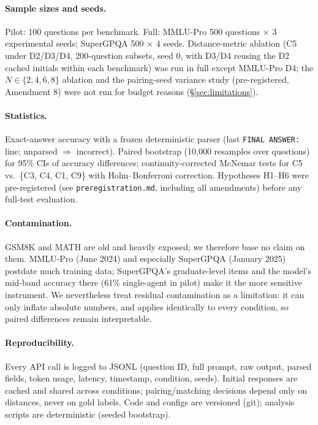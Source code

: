 \documentclass[11pt]{article}
\begin{document}
\paragraph{Sample sizes and seeds.} Pilot: 100 questions per benchmark. Full: MMLU-Pro 500 questions $\times$ 3 experimental seeds; SuperGPQA 500 $\times$ 4 seeds. Distance-metric ablation (C5 under D2/D3/D4, 200-question subsets, seed 0, with D3/D4 reusing the D2 cached initials within each benchmark) was run in full except MMLU-Pro D4; the $N \in \{2,4,6,8\}$ ablation and the pairing-seed variance study (pre-registered, Amendment 8) were not run for budget reasons (\S\ref{sec:limitations}).

\paragraph{Statistics.} Exact-answer accuracy with a frozen deterministic parser (last \texttt{FINAL ANSWER:} line; unparsed $\Rightarrow$ incorrect). Paired bootstrap (10{,}000 resamples over questions) for 95\% CIs of accuracy differences; continuity-corrected McNemar tests for C5 vs.\ \{C3, C4, C1, C9\} with Holm--Bonferroni correction. Hypotheses H1--H6 were pre-registered (see \texttt{preregistration.md}, including all amendments) before any full-test evaluation.

\paragraph{Contamination.} GSM8K and MATH are old and heavily exposed; we therefore base no claim on them. MMLU-Pro (June 2024) and especially SuperGPQA (January 2025) postdate much training data; SuperGPQA's graduate-level items and the model's mid-band accuracy there (61\% single-agent in pilot) make it the more sensitive instrument. We nevertheless treat residual contamination as a limitation: it can only inflate absolute numbers, and applies identically to every condition, so paired differences remain interpretable.

\paragraph{Reproducibility.} Every API call is logged to JSONL (question ID, full prompt, raw output, parsed fields, token usage, latency, timestamp, condition, seeds). Initial responses are cached and shared across conditions; pairing/matching decisions depend only on distances, never on gold labels. Code and configs are versioned (git); analysis scripts are deterministic (seeded bootstrap).
\end{document}
